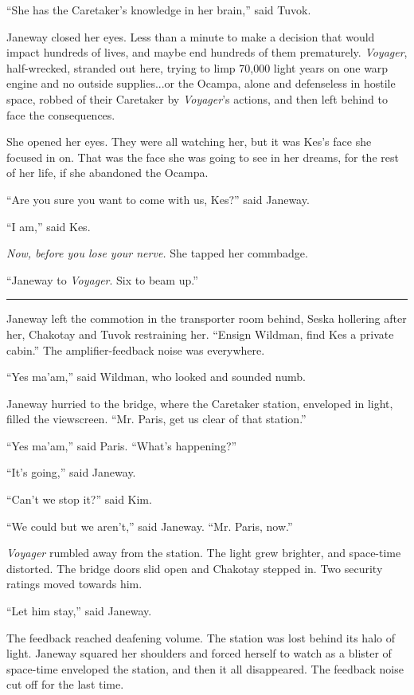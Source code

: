 \documentclass[twoside,letterpaper,12pt]{memoir}
\begin{document}
``She has the Caretaker’s knowledge in her brain,” said Tuvok. 

Janeway closed her eyes. Less than a minute to make a decision that would impact hundreds of lives, and maybe end hundreds of them prematurely. \textit{Voyager}, half-wrecked, stranded out here, trying to limp 70,000 light years on one warp engine and no outside supplies...or the Ocampa, alone and defenseless in hostile space, robbed of their Caretaker by \textit{Voyager}’s actions, and then left behind to face the consequences. 

She opened her eyes. They were all watching her, but it was Kes’s face she focused in on. That was the face she was going to see in her dreams, for the rest of her life, if she abandoned the Ocampa. 

``Are you sure you want to come with us, Kes?” said Janeway. 

``I am,” said Kes. 

\textit{Now, before you lose your nerve. }She tapped her commbadge. 

``Janeway to \textit{Voyager}. Six to beam up.” 

\begin{center}\rule{3cm}{0.4 pt}\end{center} 

Janeway left the commotion in the transporter room behind, Seska hollering after her, Chakotay and Tuvok restraining her. ``Ensign Wildman, find Kes a private cabin.” The amplifier-feedback noise was everywhere. 

``Yes ma’am,” said Wildman, who looked and sounded numb. 

Janeway hurried to the bridge, where the Caretaker station, enveloped in light, filled the viewscreen. ``Mr. Paris, get us clear of that station.” 

``Yes ma’am,” said Paris. ``What’s happening?” 

``It’s going,” said Janeway. 

``Can’t we stop it?” said Kim. 

``We could but we aren’t,” said Janeway. ``Mr. Paris, now.” 

\textit{Voyager} rumbled away from the station. The light grew brighter, and space-time distorted. The bridge doors slid open and Chakotay stepped in. Two security ratings moved towards him. 

``Let him stay,” said Janeway. 

The feedback reached deafening volume. The station was lost behind its halo of light. Janeway squared her shoulders and forced herself to watch as a blister of space-time enveloped the station, and then it all disappeared. The feedback noise cut off for the last time. 
\end{document}
